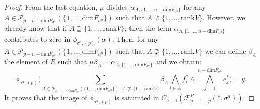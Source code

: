 \documentclass[10pt,a4paper]{amsart}
\begin{document}
\begin{proof}
    From the last equation, $\mu$ divides $\alpha_{A,\{1,...,n-\mathrm{dim}F_{\sigma^a}\}}$ for any $A \in \mathcal{P}_{p-n+\mathrm{dim} F_{\sigma^a}}(\{1,...,\mathrm{dim}F_{\sigma^a}\})$ such that $A \not\supseteq\{1,...,\mathrm{rank}V\}$. However, we already know that if $A \supseteq\{1,...,\mathrm{rank}V\}$, then the term $\alpha_{A,\{1,...,n-\mathrm{dim}F_{\sigma^a}\}}$ contributes to zero in $\phi_{\sigma^{a},(p)}(\alpha)$. Then, for any $A \in \mathcal{P}_{p-n+\mathrm{dim} F_{\sigma^a}}(\{1,...,\mathrm{dim}F_{\sigma^a}\})$ such that $A \not\supseteq\{1,...,\mathrm{rank}V\}$ we can define $\beta_A$ the element of $R$ such that $\mu\beta_A = \alpha_{A,\{1,...,\mathrm{dim}F_{\sigma^a}\}}$ and we obtain:
    \begin{equation*}
        \phi_{\sigma^{a},(p)}\Bigg( \sum_{A \in \mathcal{P}_{p-n+\mathrm{dim} F_{\sigma^a}}(\{1,...,\mathrm{dim}F_{\sigma^a}\}), ~A\not\supseteq\{1,...\mathrm{rank}V\}}\beta_A\bigwedge_{i\in A}f_i^*\wedge \bigwedge_{j=1}^{n-\mathrm{dim}F_{\sigma^a}}e_j^* \Bigg) = y.
    \end{equation*}
    It proves that the image of $\phi_{\sigma^{a},(p)}$ is saturated in $C_{a-1}(\mathcal{F}_{n-1-p}^R(*,\sigma^a))$.
\end{proof}
\end{document}
